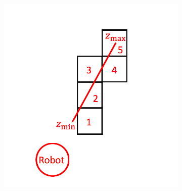 \documentclass[11pt,professionalfonts,hyperref={pdftex,pdfpagemode=none,pdfstartview=FitH}]{beamer}
\begin{document}
\begin{frame}
\begin{figure}[!ht]
\begin{subfigure}[t]{0.4\columnwidth}
        \includegraphics[width=\textwidth]{RayCastIllustrationReducedMapOnly.png}
    \end{subfigure}
\end{figure}

\end{frame}
\end{document}
